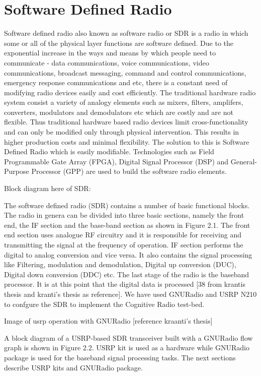 \chapter{Software Defined Radio}
Software defined radio also known as software radio or SDR is a radio in which
some or all of the physical layer functions are software defined. Due to the  
exponential increase in the ways and means by which people need to communicate
- data communications, voice communications, video communications, broadcast 
messaging, command and control communications, emergency response 
communications and etc, there is a constant need of modifying radio devices 
easily and cost efficiently. The traditional hardware radio system consist a 
variety of analogy elements such as mixers, filters, amplifers, converters, 
modulators and demodulators etc which are costly and are not flexible. Thus 
traditional hardware based radio devices limit cross-functionality and can 
only be modified only through physical intervention. This results in higher 
production costs and minimal flexibility. The solution to this is Software 
Defined Radio which is easily modifiable. Technologies such as Field 
Programmable Gate Array (FPGA), Digital Signal Processor (DSP) and 
General-Purpose Processor (GPP) are used to build the software radio elements.

Block diagram here of SDR:

The software defined radio (SDR) contains a number of basic functional blocks.
The radio in genera can be divided into three basic sections, namely the front
end, the IF section and the base-band section as shown in Figure 2.1. The 
front end section uses analogue RF circuitry and it is responsible for 
receiving and transmitting the signal at the frequency of operation. IF 
section performs the digital to analog conversion and vice versa. It also 
contains the signal processing like Filtering, modulation and demodulation, 
Digital up conversion (DUC), Digital down conversion (DDC) etc. The last stage
of the radio is the baseband processor. It is at this point that the digital 
data is processed [38 from krantis thesis and kranti’s thesis as reference].
We have used GNURadio and USRP N210 to confgure the SDR to implement the
Cognitive Radio test-bed. 

Image of usrp operation with GNURadio [reference kraanti’s thesis]

A block diagram of a USRP-based SDR transceiver built with a GNURadio flow 
graph is shown in Figure 2.2. USRP kit is used as a hardware while GNURadio
package is used for the baseband signal processing tasks. The next sections
describe USRP kits and GNURadio package.



